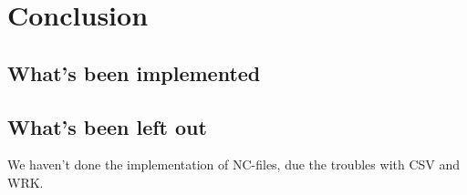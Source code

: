 \chapter{Conclusion}
\section{What's been implemented}

\section{What's been left out}
We haven't done the implementation of NC-files, due the troubles with CSV and WRK.